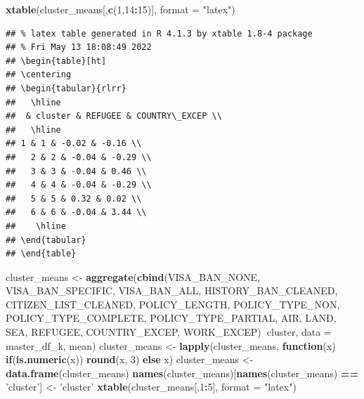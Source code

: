 \documentclass[]{article}
\newenvironment{Shaded}{\begin{snugshade}}{\end{snugshade}}
\newcommand{\ControlFlowTok}[1]{\textcolor[rgb]{0.13,0.29,0.53}{\textbf{#1}}}
\newcommand{\DataTypeTok}[1]{\textcolor[rgb]{0.13,0.29,0.53}{#1}}
\newcommand{\DecValTok}[1]{\textcolor[rgb]{0.00,0.00,0.81}{#1}}
\newcommand{\KeywordTok}[1]{\textcolor[rgb]{0.13,0.29,0.53}{\textbf{#1}}}
\newcommand{\NormalTok}[1]{#1}
\newcommand{\OperatorTok}[1]{\textcolor[rgb]{0.81,0.36,0.00}{\textbf{#1}}}
\newcommand{\StringTok}[1]{\textcolor[rgb]{0.31,0.60,0.02}{#1}}
\begin{document}
\begin{Shaded}
\begin{Highlighting}[]
\KeywordTok{xtable}\NormalTok{(cluster_means[,}\KeywordTok{c}\NormalTok{(}\DecValTok{1}\NormalTok{,}\DecValTok{14}\OperatorTok{:}\DecValTok{15}\NormalTok{)], }\DataTypeTok{format =} \StringTok{"latex"}\NormalTok{)}
\end{Highlighting}
\end{Shaded}

\begin{verbatim}
## % latex table generated in R 4.1.3 by xtable 1.8-4 package
## % Fri May 13 18:08:49 2022
## \begin{table}[ht]
## \centering
## \begin{tabular}{rlrr}
##   \hline
##  & cluster & REFUGEE & COUNTRY\_EXCEP \\ 
##   \hline
## 1 & 1 & -0.02 & -0.16 \\ 
##   2 & 2 & -0.04 & -0.29 \\ 
##   3 & 3 & -0.04 & 0.46 \\ 
##   4 & 4 & -0.04 & -0.29 \\ 
##   5 & 5 & 0.32 & 0.02 \\ 
##   6 & 6 & -0.04 & 3.44 \\ 
##    \hline
## \end{tabular}
## \end{table}
\end{verbatim}

\begin{Shaded}
\begin{Highlighting}[]
\NormalTok{cluster_means <-}\StringTok{ }\KeywordTok{aggregate}\NormalTok{(}\KeywordTok{cbind}\NormalTok{(VISA_BAN_NONE, VISA_BAN_SPECIFIC, VISA_BAN_ALL,}
\NormalTok{                HISTORY_BAN_CLEANED,}
\NormalTok{                CITIZEN_LIST_CLEANED, POLICY_LENGTH, POLICY_TYPE_NON, }
\NormalTok{                POLICY_TYPE_COMPLETE, POLICY_TYPE_PARTIAL,}
\NormalTok{                AIR, LAND, }
\NormalTok{                SEA, REFUGEE, COUNTRY_EXCEP, WORK_EXCEP)}\OperatorTok{~}\NormalTok{cluster, }\DataTypeTok{data =}\NormalTok{ master_df_k, mean)}
\NormalTok{cluster_means <-}\StringTok{ }\KeywordTok{lapply}\NormalTok{(cluster_means, }\ControlFlowTok{function}\NormalTok{(x) }\ControlFlowTok{if}\NormalTok{(}\KeywordTok{is.numeric}\NormalTok{(x)) }\KeywordTok{round}\NormalTok{(x, }\DecValTok{3}\NormalTok{) }\ControlFlowTok{else}\NormalTok{ x)}
\NormalTok{cluster_means <-}\StringTok{ }\KeywordTok{data.frame}\NormalTok{(cluster_means)}
\KeywordTok{names}\NormalTok{(cluster_means)[}\KeywordTok{names}\NormalTok{(cluster_means) }\OperatorTok{==}\StringTok{ 'cluster'}\NormalTok{] <-}\StringTok{ 'cluster'}
\KeywordTok{xtable}\NormalTok{(cluster_means[,}\DecValTok{1}\OperatorTok{:}\DecValTok{5}\NormalTok{], }\DataTypeTok{format =} \StringTok{"latex"}\NormalTok{)}
\end{Highlighting}
\end{Shaded}
\end{document}
